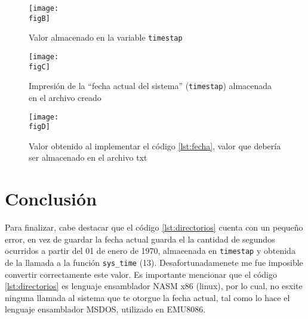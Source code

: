 	\begin{figure}[h]
		\centering
		\texttt{[image: \\figB]}
		\caption{Valor almacenado en la variable \texttt{timestap}}
	\end{figure}

	\begin{figure}[h]
		\centering
		\texttt{[image: \\figC]}
		\caption{Impresión de la ``fecha actual del sistema'' (\texttt{timestap}) almacenada en el archivo creado}
	\end{figure}

	\begin{figure}[h]
		\centering
		\texttt{[image: \\figD]}
		\caption{Valor obtenido al implementar el código \ref{lst:fecha}, valor que debería ser almacenado en el archivo txt}
	\end{figure}

	\clearpage
	\section{Conclusión}

	Para finalizar, cabe destacar que el código \ref{lst:directorios} cuenta con un pequeño error, en vez de guardar la fecha actual guarda el la cantidad de segundos ocurridos a partir del 01 de enero de 1970, almacenada en \texttt{timestap} y obtenida de la llamada a la función \texttt{sys\_time} (13). Desafortunadamenete me fue imposible convertir correctamente este valor. Es importante mencionar que el código \ref{lst:directorios} es lenguaje ensamblador NASM x86 (linux), por lo cual, no esxite ninguna llamada al sistema que te otorgue la fecha actual, tal como lo hace el lenguaje ensamblador MSDOS, utilizado en EMU8086.

